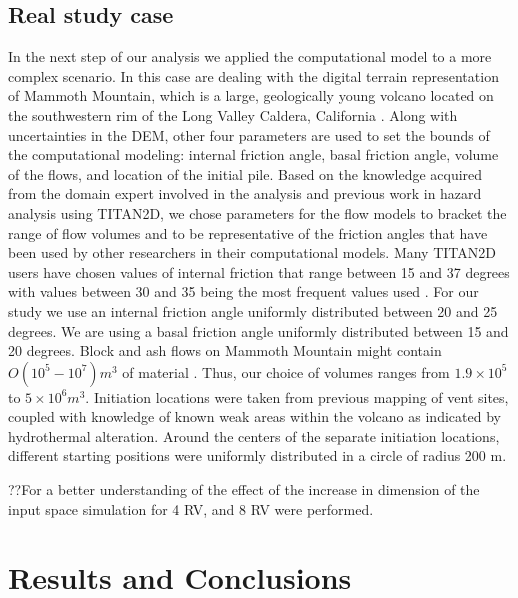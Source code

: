\documentclass{article}
\begin{document}
\subsection{Real study case}
In the next step of our analysis we applied the computational model to
a more complex scenario. In this case are dealing with the digital terrain
representation of Mammoth Mountain, which is a large, geologically 
young volcano located on the southwestern rim of the Long Valley 
Caldera, California \citep{Bailey1989}. 
Along with uncertainties in the DEM, other four 
parameters are used to set the bounds of the computational modeling:
internal friction angle, basal friction angle, volume of the flows, and location 
of the initial pile. 
Based on the knowledge acquired from the domain expert  involved in the 
analysis and previous work in hazard analysis using TITAN2D, we 
chose parameters for the flow models to bracket the range of flow volumes 
and to be representative of the friction angles that have been used by other
researchers in their computational models.  
Many TITAN2D users have chosen values of internal friction that range between
15 and 37 degrees with
values between 30 and 35 being the most frequent values used \citep{Patra2005, murcia_2010}.  For our study we use an internal
friction angle uniformly distributed between 20 and 25 degrees.
We are using a basal friction angle
uniformly distributed between 15 and 20 degrees.
Block and ash flows on Mammoth Mountain might contain $O(10^5 -
10^7) m^3$ of material  \citep{Patra2005, Burkett2007}. Thus, our
choice of volumes ranges from $1.9 \times 10^5$ to $5 \times 10^6
m^3$.  
Initiation locations were taken from previous mapping of vent sites,
coupled with knowledge of known weak areas within the volcano as
indicated by hydrothermal alteration.  Around the centers of the
separate initiation locations, different starting positions were
uniformly distributed in a circle of radius 200 m.  

??For a better understanding of the effect of the increase in dimension
of the input space simulation for 4 RV,  and 8 RV were performed.


\section{Results and Conclusions}
\end{document}
